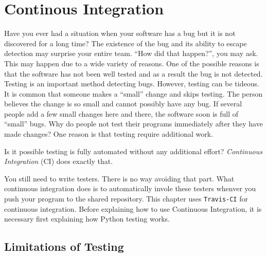 \chapter{Continous Integration}


Have you ever had a situation when your software has a bug but it is
not discovered for a long time?  The existence of the bug and its
ability to escape detection may surprise your entire team. ``How did
that happen?'', you may ask.  This may happen due to a wide variety of
reasons. One of the possible reasons is that the software has not been
well tested and as a result the bug is not detected. Testing is an
important method detecting bugs.  However, testing can be tideous.  It
is common that someone makes a ``small'' change and skips testing.
The person believes the change is so small and cannot possibly have
any bug.  If several people add a few small changes here and there,
the software soon is full of ``small'' bugs.  Why do people not test
their programs immediately after they have made changes?  One reason
is that testing require additional work.

Is it possible testing is fully automated without any additional
effort? {\it Continuous Integration} (CI) does exactly that.

You still need to write testers. There is no way avoiding that part.
What continuous integration does is to automatically invole these
testers whenver you push your program to the shared repository.
This chapter uses {\tt Travis-CI} for continuous integration. Before explaining how
to use Continuous Integration, it is necessary first explaining how Python
testing works.

\section{Limitations of Testing}

